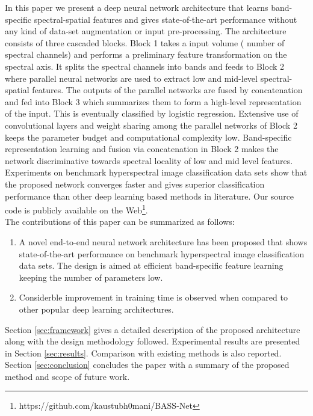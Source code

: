\documentclass[journal]{IEEEtran}
\begin{document}
In this paper we present a deep neural network architecture that learns band-specific spectral-spatial features and gives state-of-the-art performance without any kind of data-set augmentation or input pre-processing. The architecture consists of three cascaded blocks. Block 1 takes a  input volume ( number of spectral channels) and performs a preliminary feature transformation on the spectral axis. It splits the spectral channels into bands and feeds to Block 2 where parallel neural networks are used to extract low and mid-level spectral-spatial features. The outputs of the parallel networks are fused by concatenation and fed into Block 3 which summarizes them to form a high-level representation of the input. This is eventually classified by logistic regression. Extensive use of convolutional layers and weight sharing among the parallel networks of Block 2 keeps the parameter budget and computational complexity low. Band-specific representation learning and fusion via concatenation in Block 2 makes the network discriminative towards spectral locality of low and mid level features. Experiments on benchmark hyperspectral image classification data sets show that the proposed network converges faster and gives superior classification performance than other deep learning based methods in literature. Our source code is publicly available on the Web\footnote{https://github.com/kaustubh0mani/BASS-Net}.\\

The contributions of this paper can be summarized as follows:\\

\begin{enumerate}
\item A novel end-to-end neural network architecture has been proposed that shows state-of-the-art performance on benchmark hyperspectral image classification data sets. The design is aimed at efficient band-specific feature learning keeping the number of parameters low.\\

\item Considerble improvement in training time is observed when compared to other popular deep learning architectures.\\ 

\end{enumerate}

Section \ref{sec:framework} gives a detailed description of the proposed architecture along with the design methodology followed. Experimental results are presented in Section \ref{sec:results}. Comparison with existing methods is also reported. Section \ref{sec:conclusion} concludes the paper with a summary of the proposed method and scope of future work.
\end{document}
